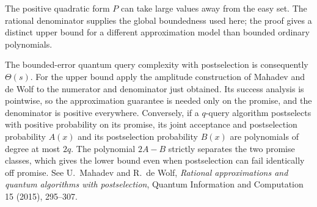 The positive quadratic form \(P\) can take large values away from the easy set. The rational denominator supplies the global boundedness used here; the proof gives a distinct upper bound for a different approximation model than bounded ordinary polynomials.

The bounded-error quantum query complexity with postselection is consequently
$\Theta(s)$. For the upper bound apply the amplitude construction of
Mahadev and de Wolf to the numerator and denominator just obtained.
Its success analysis is pointwise, so the approximation guarantee is needed
only on the promise, and the denominator is positive everywhere.
Conversely, if a $q$-query algorithm postselects with positive probability
on its promise, its joint acceptance and postselection probability $A(x)$
and its postselection probability $B(x)$ are polynomials of degree at most
$2q$. The polynomial $2A-B$ strictly separates the two promise classes,
which gives the lower bound even when postselection can fail identically
off promise. See U.~Mahadev and R.~de Wolf,
\emph{Rational approximations and quantum algorithms with postselection},
Quantum Information and Computation 15 (2015), 295--307.
